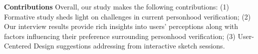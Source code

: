 \textbf{Contributions}
Overall, our study makes the following contributions: (1) Formative study sheds light on challenges in current personhood verification; (2) Our interview results provide rich insights into users' perceptions along with factors influencing their preference surrounding personhood verification; (3) User-Centered Design suggestions addressing from interactive sketch sessions.

